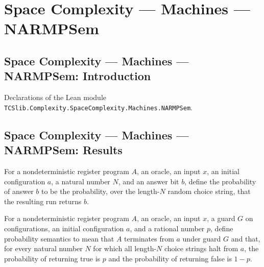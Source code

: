 \section{Space Complexity --- Machines --- NARMPSem}
\subsection*{Space Complexity --- Machines --- NARMPSem: Introduction}

Declarations of the Lean module \texttt{TCSlib.Complexity.SpaceComplexity.Machines.NARMPSem}.

\subsection*{Space Complexity --- Machines --- NARMPSem: Results}

\begin{definition}
\label{Complexity.LogProg.ansProb}
\leanok
{}
For a nondeterministic register program $A$, an oracle, an input $x$, an initial
configuration $a$, a natural number $N$, and an answer bit $b$, define the probability
of answer $b$ to be the probability, over the length-$N$ random choice string, that the
resulting run returns $b$.
\end{definition}

\begin{definition}
\label{Complexity.LogProg.PSem}
\leanok
{}
For a nondeterministic register program $A$, an oracle, an input $x$, a guard $G$ on
configurations, an initial configuration $a$, and a rational number $p$, define
probability semantics to mean that $A$ terminates from $a$ under guard $G$ and that, for
every natural number $N$ for which all length-$N$ choice strings halt from $a$, the
probability of returning true is $p$ and the probability of returning false is $1-p$.
\end{definition}

